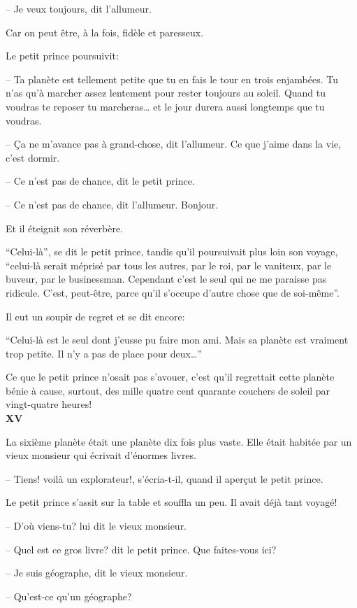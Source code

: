 \begin{Parallel}[p]{}{}
{-- Je veux toujours, dit l'allumeur.

Car on peut être, à la fois, fidèle et paresseux.

Le petit prince poursuivit:

-- Ta planète est tellement petite que tu en fais le
tour en trois enjambées. Tu n'as qu'à marcher assez
lentement pour rester toujours au soleil. Quand tu
voudras te reposer tu marcheras\ldots{} et le jour durera
aussi longtemps que tu voudras.

-- Ça ne m'avance pas à grand-chose, dit l'allumeur. Ce que j'aime dans la vie, c'est dormir.

-- Ce n'est pas de chance, dit le petit prince.

-- Ce n'est pas de chance, dit l'allumeur. Bonjour.

Et il éteignit son réverbère.

``Celui-là'', se dit le petit prince, tandis qu'il poursuivait plus loin son voyage, ``celui-là serait méprisé
par tous les autres, par le roi, par le vaniteux, par le
buveur, par le businessman. Cependant c'est le seul
qui ne me paraisse pas ridicule. C'est, peut-être, parce qu'il s'occupe d'autre chose que de soi-même''.

Il eut un soupir de regret et se dit encore:

``Celui-là est le seul dont j'eusse pu faire mon ami.
Mais sa planète est vraiment trop petite. Il n'y a pas
de place pour deux\ldots{}''

Ce que le petit prince n'osait pas s'avouer, c'est
qu'il regrettait cette planète bénie à cause, surtout,
des mille quatre cent quarante couchers de soleil
par vingt-quatre heures!\\

\textbf{XV}

La sixième planète était une planète dix fois plus
vaste. Elle était habitée par un vieux monsieur qui
écrivait d'énormes livres.

-- Tiens! voilà un explorateur!, s'écria-t-il, quand
il aperçut le petit prince.

Le petit prince s'assit sur la table et souffla un
peu. Il avait déjà tant voyagé!

-- D'où viens-tu? lui dit le vieux monsieur.

-- Quel est ce gros livre? dit le petit prince. Que
faites-vous ici?

-- Je suis géographe, dit le vieux monsieur.

-- Qu'est-ce qu'un géographe?

}
\end{Parallel}
